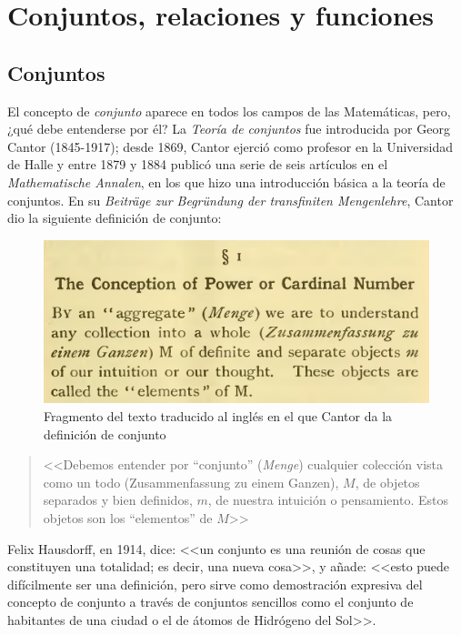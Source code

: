 \chapter{Conjuntos, relaciones y funciones}

\section{Conjuntos}

El concepto de \textit{conjunto} aparece en todos los campos de las
Matemáticas, pero, ¿qué debe entenderse por él? La \textit{Teoría de conjuntos}
fue introducida por Georg Cantor (1845-1917); desde 1869, Cantor ejerció como
profesor en la Universidad de Halle y entre 1879 y 1884 publicó una serie de
seis artículos en el \textit{Mathematische Annalen}, en los que hizo una
introducción básica a la teoría de conjuntos. En su \textit{Beiträge zur
Begründung der transfiniten Mengenlehre}, Cantor dio la siguiente definición
de conjunto:

\begin{figure}[h]
  \centering
  \includegraphics[scale=.2]{fig/definicionConjunto}
  \captionsetup{font=footnotesize}
  \caption{Fragmento del texto traducido al inglés en el que Cantor da la
    definición de conjunto}
\end{figure}

\begin{quote}
  <<Debemos entender por ``conjunto'' (\textit{Menge}) cualquier colección
  vista como un todo (Zusammenfassung zu einem Ganzen), $M$, de objetos
  separados y bien definidos, $m$, de nuestra intuición o pensamiento. Estos
  objetos son los ``elementos'' de $M$>>
\end{quote}

Felix Hausdorff, en 1914, dice: <<un conjunto es una reunión de cosas que
constituyen una totalidad; es decir, una nueva cosa>>, y añade: <<esto puede
difícilmente ser una definición, pero sirve como demostración expresiva del
concepto de conjunto a través de conjuntos sencillos como el conjunto de
habitantes de una ciudad o el de átomos de Hidrógeno del Sol>>.

